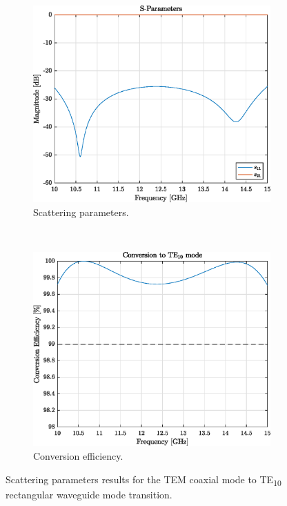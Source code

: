 \documentclass[english,twoside]{article}
\begin{document}
		\begin{figure}[H]
			\centering
      
			\begin{subfigure}[b]{0.48\textwidth}
				\includegraphics[width=\textwidth]{figures/coaxToWaveguide}
				\caption{Scattering parameters.}
			\end{subfigure}
			~
			\begin{subfigure}[b]{0.48\textwidth}
				\includegraphics[width=\textwidth]{figures/coaxToWaveguide_eff}
				\caption{Conversion efficiency.}
			\end{subfigure}
		
			\caption{Scattering parameters results for the TEM coaxial mode to TE\textsubscript{10} rectangular waveguide mode transition.}
			\label{fig:coaxToWaveguide}
		\end{figure}
	
\end{document}
